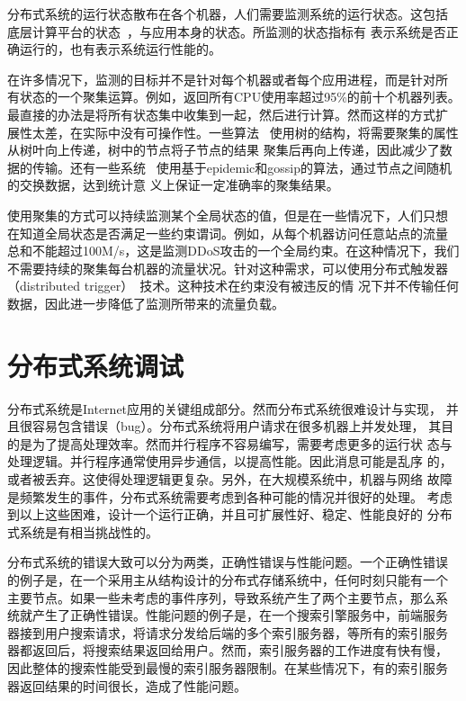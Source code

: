 分布式系统的运行状态散布在各个机器，人们需要监测系统的运行状态。这包括
底层计算平台的状态~\cite{comon}，与应用本身的状态。所监测的状态指标有
表示系统是否正确运行的，也有表示系统运行性能的。

在许多情况下，监测的目标并不是针对每个机器或者每个应用进程，而是针对所
有状态的一个聚集运算。例如，返回所有CPU使用率超过95\%的前十个机器列表。
最直接的办法是将所有状态集中收集到一起，然后进行计算。然而这样的方式扩
展性太差，在实际中没有可操作性。一些算法~\cite{sdims, somo, sanfermin}
使用树的结构，将需要聚集的属性从树叶向上传递，树中的节点将子节点的结果
聚集后再向上传递，因此减少了数据的传输。还有一些系统~\cite{astrolabe}
使用基于epidemic和gossip的算法，通过节点之间随机的交换数据，达到统计意
义上保证一定准确率的聚集结果。

使用聚集的方式可以持续监测某个全局状态的值，但是在一些情况下，人们只想
在知道全局状态是否满足一些约束谓词。例如，从每个机器访问任意站点的流量
总和不能超过100M/s，这是监测DDoS攻击的一个全局约束。在这种情况下，我们
不需要持续的聚集每台机器的流量状况。针对这种需求，可以使用分布式触发器
（distributed trigger）~\cite{Jain2004, Huang2006, Keralapura2006,
Sharfman2007, Cormode2005, Das2004}技术。这种技术在约束没有被违反的情
况下并不传输任何数据，因此进一步降低了监测所带来的流量负载。

\section{分布式系统调试}
\label{sec:intro_debugging}

分布式系统是Internet应用的关键组成部分。然而分布式系统很难设计与实现，
并且很容易包含错误（bug）。分布式系统将用户请求在很多机器上并发处理，
其目的是为了提高处理效率。然而并行程序不容易编写，需要考虑更多的运行状
态与处理逻辑。并行程序通常使用异步通信，以提高性能。因此消息可能是乱序
的，或者被丢弃。这使得处理逻辑更复杂。另外，在大规模系统中，机器与网络
故障是频繁发生的事件，分布式系统需要考虑到各种可能的情况并很好的处理。
考虑到以上这些困难，设计一个运行正确，并且可扩展性好、稳定、性能良好的
分布式系统是有相当挑战性的。

分布式系统的错误大致可以分为两类，正确性错误与性能问题。一个正确性错误
的例子是，在一个采用主从结构设计的分布式存储系统中，任何时刻只能有一个
主要节点。如果一些未考虑的事件序列，导致系统产生了两个主要节点，那么系
统就产生了正确性错误。性能问题的例子是，在一个搜索引擎服务中，前端服务
器接到用户搜索请求，将请求分发给后端的多个索引服务器，等所有的索引服务
器都返回后，将搜索结果返回给用户。然而，索引服务器的工作进度有快有慢，
因此整体的搜索性能受到最慢的索引服务器限制。在某些情况下，有的索引服务
器返回结果的时间很长，造成了性能问题。

